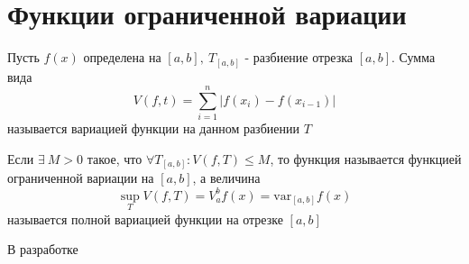 \newpage
\section{Функции ограниченной вариации}
\begin{definition}
    Пусть $f(x)$ определена на $[a,b],\ T_{[a,b]}$ - разбиение отрезка $[a,b]$. Сумма вида 
    \[V(f,t)=\sum\limits_{i=1}^{n}|f(x_i)-f(x_{i-1})|\]
    называется вариацией функции на данном разбиении $T$
\end{definition} 
\begin{definition}
    Если $\exists\ M>0$ такое, что $\forall T_{[a,b]}: V(f,T)\leq M$, то функция называется функцией ограниченной вариации на $[a,b]$, а величина
    \[\sup\limits_{T}V(f,T)= V_a^b f(x)=\text{var}_{[a,b]}f(x)\] %
    называется полной вариацией функции на отрезке $[a,b]$
\end{definition} 
\begin{examples}
    В разработке
\end{examples}
